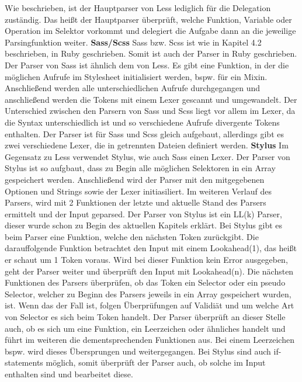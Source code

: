 Wie beschrieben, ist der Hauptparser von Less lediglich für die Delegation zuständig. Das heißt der Hauptparser überprüft, welche Funktion, Variable oder Operation im Selektor vorkommt und delegiert die Aufgabe dann an die jeweilige Parsingfunktion weiter. \autocite[]{Sellier.2013a}
\newline\newline
\textbf{Sass/Scss}\newline
Sass bzw. Scss ist wie in Kapitel 4.2 beschrieben, in Ruby geschrieben. Somit ist auch der Parser in Ruby geschrieben.\newline
Der Parser von Sass ist ähnlich dem von Less. Es gibt eine Funktion, in der die möglichen Aufrufe im Stylesheet initialisiert werden, bspw. für ein Mixin. Anschließend werden alle unterschiedlichen Aufrufe durchgegangen und anschließend werden die Tokens mit einem Lexer gescannt und umgewandelt.
Der Unterschied zwischen den Parsern von Sass und Scss liegt vor allem im Lexer, da die Syntax unterschiedlich ist und so verschiedene Aufrufe divergente Tokens enthalten. \newline
Der Parser ist für Sass und Scss gleich aufgebaut, allerdings gibt es zwei verschiedene Lexer, die in getrennten Dateien definiert werden. \autocite[]{Yard.2014a}
\newline\newline
\textbf{Stylus}\newline
Im Gegensatz zu Less verwendet Stylus, wie auch Sass einen Lexer. Der Parser von Stylus ist so aufgbaut, dass zu Begin alle möglichen Selektoren in ein Array gespeichert werden. Anschließend wird der Parser mit den mitgegebenen Optionen und Strings sowie der Lexer initiasiliert.\newline
Im weiteren Verlauf des Parsers, wird mit 2 Funktionen der letzte und aktuelle Stand des Parsers ermittelt und der Input geparsed.\newline
Der Parser von Stylus ist ein LL(k) Parser, dieser wurde schon zu Begin des aktuellen Kapitels erklärt. Bei Stylus gibt es beim Parser eine Funktion, welche den nächsten Token zurückgibt. Die darauffolgende Funktion betrachtet den Input mit einem Lookahead(1), das heißt er schaut um 1 Token voraus. Wird bei dieser Funktion kein Error ausgegeben, geht der Parser weiter und überprüft den Input mit Lookahead(n). \newline
Die nächsten Funktionen des Parsers überprüfen, ob das Token ein Selector oder ein pseudo Selector, welcher zu Beginn des Parsers jeweils in ein Array gespeichert wurden, ist. Wenn das der Fall ist, folgen Überprüfungen auf Validiät und um welche Art von Selector es sich beim Token handelt. Der Parser überprüft an dieser Stelle auch, ob es sich um eine Funktion, ein Leerzeichen oder ähnliches handelt und führt im weiteren die dementsprechenden Funktionen aus. Bei einem Leerzeichen bspw. wird dieses Übersprungen und weitergegangen.\newline
Bei Stylus sind auch if-statements möglich, somit überprüft der Parser auch, ob solche im Input enthalten sind und bearbeitet diese. \autocite[]{LearnBoost.2010a}
\newpage
